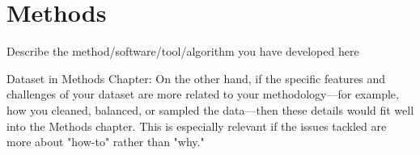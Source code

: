 \chapter{Methods}\label{chap:methods}


Describe the method/software/tool/algorithm you have developed here

Dataset in Methods Chapter: On the other hand, if the specific features and challenges of your dataset are more related to your methodology—for example, how you cleaned, balanced, or sampled the data—then these details would fit well into the Methods chapter. This is especially relevant if the issues tackled are more about "how-to" rather than "why."

